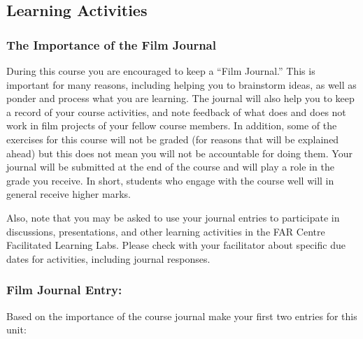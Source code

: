 \documentclass[
]{book}
\begin{document}
\hypertarget{learning-activities}{%
\subsection*{Learning Activities}\label{learning-activities}}

\begin{reflect}
\hypertarget{the-importance-of-the-film-journal}{%
\subsubsection*{The Importance of the Film Journal}\label{the-importance-of-the-film-journal}}

During this course you are encouraged to keep a ``Film Journal.'' This is important for many reasons, including helping you to brainstorm ideas, as well as ponder and process what you are learning. The journal will also help you to keep a record of your course activities, and note feedback of what does and does not work in film projects of your fellow course members. In addition, some of the exercises for this course will not be graded (for reasons that will be explained ahead) but this does not mean you will not be accountable for doing them. Your journal will be submitted at the end of the course and will play a role in the grade you receive. In short, students who engage with the course well will in general receive higher marks.

Also, note that you may be asked to use your journal entries to participate in discussions, presentations, and other learning activities in the FAR Centre Facilitated Learning Labs. Please check with your facilitator about specific due dates for activities, including journal responses.

\hypertarget{film-journal-entry}{%
\subsubsection*{Film Journal Entry:}\label{film-journal-entry}}

Based on the importance of the course journal make your first two entries for this unit:


\end{reflect}
\end{document}
